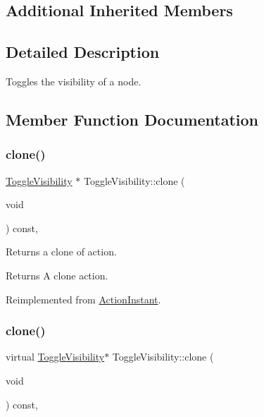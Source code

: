 \subsection*{Additional Inherited Members}


\subsection{Detailed Description}
Toggles the visibility of a node. 

\subsection{Member Function Documentation}
\mbox{\label{classToggleVisibility_a6a9b7e14c73ee877b9f4b29af4f7f5aa}} 
\subsubsection{\texorpdfstring{clone()}{clone()}\hspace{0.1cm}{\footnotesize\ttfamily [1/2]}}
{\footnotesize\ttfamily \hyperlink{classToggleVisibility}{Toggle\+Visibility} $\ast$ Toggle\+Visibility\+::clone (\begin{DoxyParamCaption}\item[{void}]{ }\end{DoxyParamCaption}) const\hspace{0.3cm}{\ttfamily [override]}, {\ttfamily [virtual]}}

Returns a clone of action.

\begin{DoxyReturn}{Returns}
A clone action. 
\end{DoxyReturn}


Reimplemented from \hyperlink{classActionInstant_adb76fc6f006098109e8256210cbd8cc0}{Action\+Instant}.

\mbox{\label{classToggleVisibility_ab1ce8f24f1840b08c9146b462a7810b2}} 
\subsubsection{\texorpdfstring{clone()}{clone()}\hspace{0.1cm}{\footnotesize\ttfamily [2/2]}}
{\footnotesize\ttfamily virtual \hyperlink{classToggleVisibility}{Toggle\+Visibility}$\ast$ Toggle\+Visibility\+::clone (\begin{DoxyParamCaption}\item[{void}]{ }\end{DoxyParamCaption}) const\hspace{0.3cm}{\ttfamily [override]}, {\ttfamily [virtual]}}

